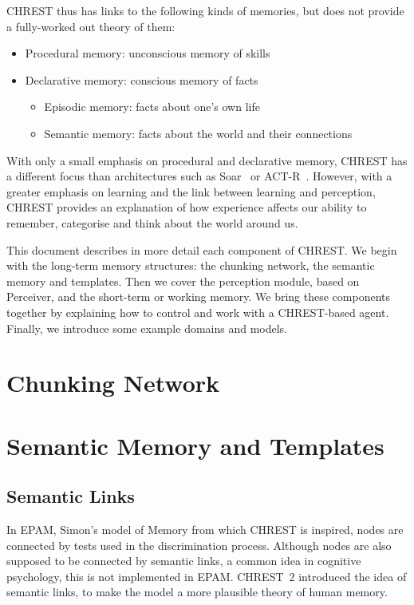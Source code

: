 \documentclass{article}
\begin{document}
CHREST thus has links to the following kinds of memories, but does not provide
a fully-worked out theory of them:

\begin{itemize}
\item Procedural memory: unconscious memory of skills
\item Declarative memory: conscious memory of facts
\begin{itemize}
\item Episodic memory: facts about one's own life
\item Semantic memory: facts about the world and their connections
\end{itemize}
\end{itemize}

With only a small emphasis on procedural and declarative memory, CHREST has a
different focus than architectures such as Soar~\cite{Laird12,Newell90} or
ACT-R~\cite{Anderson98}.  However, with a greater emphasis on learning and the 
link between learning and perception, CHREST provides an explanation of how 
experience affects our ability to remember, categorise and think about the 
world around us.

This document describes in more detail each component of CHREST.  We begin with
the long-term memory structures: the chunking network, the semantic
memory and templates.  Then we cover the perception module, based on Perceiver,
and the short-term or working memory.  We bring these  components together by
explaining how to control and work with a CHREST-based agent.  Finally, we
introduce some example domains and models.

\section{Chunking Network}


\section{Semantic Memory and Templates}

\subsection{Semantic Links}

In EPAM, Simon's model of Memory from which CHREST is inspired, nodes are
connected by tests used in the discrimination process.  Although nodes are also
supposed to be connected by semantic links, a common idea in cognitive
psychology, this is not implemented in EPAM.  CHREST~2 introduced the idea of
semantic links, to make the model a more plausible theory of human memory.
\end{document}
